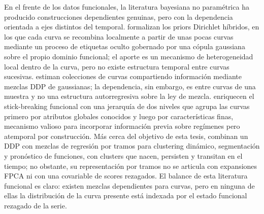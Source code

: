 En el frente de los datos funcionales, la literatura bayesiana no paramétrica ha producido construcciones dependientes genuinas, pero con la dependencia orientada a ejes distintos del temporal. \citet{03_01_petrone2009hybrid} formalizan los priors Dirichlet híbridos, en los que cada curva se recombina localmente a partir de unas pocas curvas mediante un proceso de etiquetas oculto gobernado por una cópula gaussiana sobre el propio dominio funcional; el aporte es un mecanismo de heterogeneidad local dentro de la curva, pero no existe estructura temporal entre curvas sucesivas. \citet{03_01_rodriguez2009functional} estiman colecciones de curvas compartiendo información mediante mezclas DDP de gaussianas; la dependencia, sin embargo, es entre curvas de una muestra y no una estructura autorregresiva sobre la ley de mezcla. \citet{03_01_scarpa2014enriched} enriquecen el stick-breaking funcional con una jerarquía de dos niveles que agrupa las curvas primero por atributos globales conocidos y luego por características finas, mecanismo valioso para incorporar información previa sobre regímenes pero atemporal por construcción. Más cerca del objetivo de esta tesis, \citet{03_01_gamasaee2017mining} combinan un DDP con mezclas de regresión por tramos para clustering dinámico, segmentación y pronóstico de funciones, con clusters que nacen, persisten y transitan en el tiempo; no obstante, su representación por tramos no se articula con expansiones FPCA ni con una covariable de scores rezagados. El balance de esta literatura funcional es claro: existen mezclas dependientes para curvas, pero en ninguna de ellas la distribución de la curva presente está indexada por el estado funcional rezagado de la serie.\\
 
